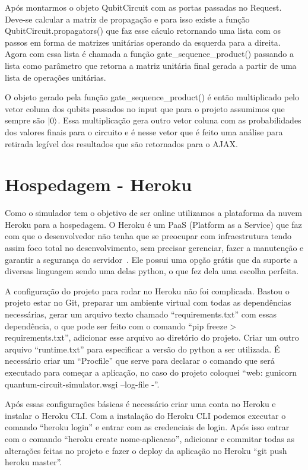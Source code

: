 \documentclass[a4paper, 12pt, oneside]{book}
\begin{document}
Após montarmos o objeto QubitCircuit com as portas passadas no Request. Deve-se calcular a matriz de propagação e para isso existe a função QubitCircuit.propagators() que faz esse cáculo retornando uma lista com os passos em forma de matrizes unitárias operando da esquerda para a direita. Agora com essa lista é chamada a função gate\_sequence\_product() passando a lista como parâmetro que retorna a matriz unitária final gerada a partir de uma lista de operações unitárias. 

O objeto gerado pela função gate\_sequence\_product() é então multiplicado pelo vetor coluna dos qubits passados no input que para o projeto assumimos que sempre são $\ket{0}$. Essa multiplicação gera outro vetor coluna com as probabilidades dos valores finais para o circuito e é nesse vetor que é feito uma análise para retirada legível dos resultados que são retornados para o AJAX.

\section{Hospedagem - Heroku}

Como o simulador tem o objetivo de ser online utilizamos a plataforma da nuvem Heroku para a hospedagem. O Heroku é um PaaS (Platform as a Service) que faz com que o desenvolvedor não tenha que se preocupar com infraestrutura tendo assim foco total no desenvolvimento, sem precisar gerenciar, fazer a manutenção e garantir a segurança do servidor~\cite{heroku}. Ele possui uma opção grátis que da suporte a diversas linguagem sendo uma delas python, o que fez dela uma escolha perfeita.

A configuração do projeto para rodar no Heroku não foi complicada. Bastou o projeto estar no Git, preparar um ambiente virtual com todas as dependências necessárias, gerar um arquivo texto chamado ``requirements.txt'' com essas dependência, o que pode ser feito com o comando ``pip freeze > requirements.txt'', adicionar esse arquivo ao diretório do projeto. Criar um outro arquivo ``runtime.txt'' para especificar a versão do python a ser utilizada. É necessário criar um ``Procfile'' que serve para declarar o comando que será executado para começar a aplicação, no caso do projeto coloquei ``web: gunicorn quantum-circuit-simulator.wsgi --log-file -''. 

Após essas configurações básicas é necessário criar uma conta no Heroku e instalar o Heroku CLI. Com a instalação do Heroku CLI podemos executar o comando ``heroku login'' e entrar com as credenciais de login. Após isso entrar com o comando ``heroku create nome-aplicacao'', adicionar e commitar todas as alterações feitas no projeto e fazer o deploy da aplicação no Heroku ``git push heroku master''.
\end{document}
